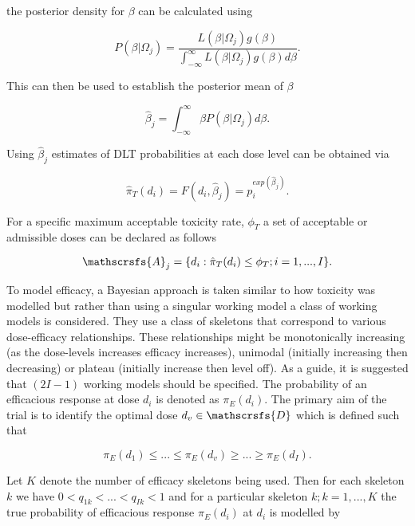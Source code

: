 the posterior density for $\beta$ can be calculated using  

\begin{equation}
	P(\beta|\Omega_j) = \frac{L(\beta|\Omega_j)g(\beta)}{\int_{-\infty}^{\infty}L(\beta|\Omega_j)g(\beta)d\beta}. 
\end{equation}

This can then be used to establish the posterior mean of $\beta$

\begin{equation}
	\hat{\beta}_j = \int_{-\infty}^{\infty}\beta P(\beta|\Omega_j)d\beta.
\end{equation} 

Using $\hat{\beta}_j$ estimates of DLT probabilities at each dose level can be obtained via 

\begin{equation}
	\hat{\pi}_T(d_i) = F(d_i, \hat{\beta}_j) = p_i^{exp(\hat{\beta}_j)}. 
\end{equation}

For a specific maximum acceptable toxicity rate, $\phi_T$ a set of acceptable or admissible doses can be declared as follows

\begin{equation}
	\mathscrsfs{A}_j = \{d_i : \hat{\pi}_T(d_i)  \leq \phi_T ; i = 1,...,I \}.
\end{equation} 

To model efficacy, a Bayesian approach is taken similar to how toxicity was modelled but rather than using a singular working model a class of working models is considered. They use a class of skeletons that correspond to various dose-efficacy relationships. These relationships might be monotonically increasing (as the dose-levels increases efficacy increases), unimodal (initially increasing then decreasing) or plateau (initially increase then level off). As a guide, it is suggested that $(2I-1)$ working models should be specified. The probability of an efficacious response at dose $d_i$ is denoted as $\pi_E(d_i)$. The primary aim of the trial is to identify the optimal dose $d_v \in \mathscrsfs{D}$ which is defined such that 

\begin{equation}
	\pi_E(d_1) \leq ... \leq \pi_E(d_v) \geq ... \geq \pi_E(d_I). 
\end{equation}

Let $K$ denote the number of efficacy skeletons being used. Then for each skeleton $k$ we have $0 < q_{1k} < ... <q_{Ik} <1$ and for a particular skeleton $k; k = 1,...,K$ the true probability of efficacious response $\pi_E(d_i)$ at $d_i$ is modelled by 

